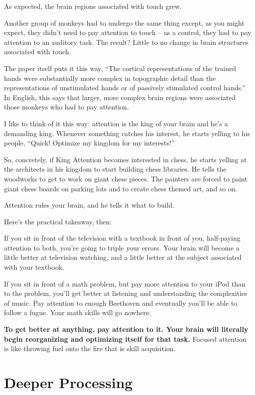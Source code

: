 As expected, the brain regions associated with touch grew.

Another group of monkeys had to undergo the same thing except, as you might
expect, they didn't need to pay attention to touch -- as a control, they had to
pay attention to an auditory task. The result? Little to no change in brain structures
associated with touch.

The paper itself puts it this way, ``The cortical representations of the trained
hands were substantially more complex in topographic detail than the
representations of unstimulated hands or of passively stimulated control
hands.'' In English, this says that larger, more complex brain regions were associated those monkeys who had
to pay attention.

I like to think of it this way: attention is the king of your brain and he's a
demanding king. Whenever something catches his interest, he starts yelling to
his people, ``Quick! Optimize my kingdom for my interests!''

So, concretely, if King Attention becomes interested in chess, he starts yelling
at the architects in his kingdom to start building chess libraries. He tells the
woodworks to get to work on giant chess pieces. The painters are forced to
paint giant chess boards on parking lots and to create chess themed art, and so
on.

Attention rules your brain, and he tells it what to build.

Here's the practical takeaway, then:

If you sit in front of the television with a textbook in front of you,
half-paying attention to both, you're going to triple your errors. Your brain
will become a little better at television watching, and a little better at the
subject associated with your textbook.

If you sit in front of a math problem, but pay more attention to your iPod than
to the problem, you'll get better at listening and understanding the
complexities of music. Pay attention to enough Beethoven and eventually you'll
be able to follow a fugue. Your math skills will go nowhere.

\textbf{To get better at anything, pay attention to it. Your brain will literally begin
reorganizing and optimizing itself for that task.} Focused attention is like
throwing fuel onto the fire that is skill acquisition.

\section{Deeper Processing}

